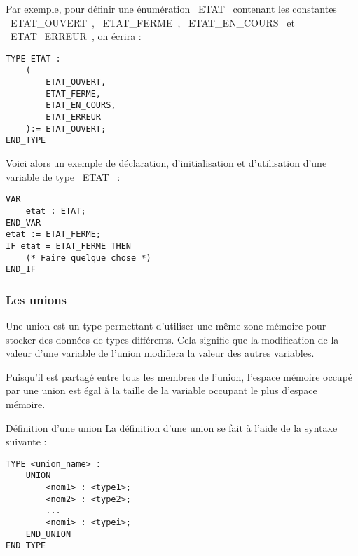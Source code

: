 Par exemple, pour définir une énumération ~ETAT~ contenant les constantes ~ETAT\_OUVERT~, ~ETAT\_FERME~, ~ETAT\_EN\_COURS~ et ~ETAT\_ERREUR~, on écrira :
\begin{lstlisting}[language=ST]
TYPE ETAT :
    (
        ETAT_OUVERT,
        ETAT_FERME,
        ETAT_EN_COURS,
        ETAT_ERREUR
    ):= ETAT_OUVERT;
END_TYPE\end{lstlisting}

Voici alors un exemple de déclaration, d'initialisation et d'utilisation d'une variable de type ~ETAT~ :
\begin{lstlisting}[language=ST]
VAR
    etat : ETAT;
END_VAR
etat := ETAT_FERME;
IF etat = ETAT_FERME THEN
    (* Faire quelque chose *)
END_IF\end{lstlisting}


\subsubsection{Les unions}
Une union est un type permettant d'utiliser une même zone mémoire pour stocker des données de types différents. Cela signifie que la modification de la valeur d'une variable de l'union modifiera la valeur des autres variables.

Puisqu'il est partagé entre tous les membres de l'union, l'espace mémoire occupé par une union est égal à la taille de la variable occupant le plus d'espace mémoire.

\begin{UPSTIinfor}{Définition d'une union}
    La définition d'une union se fait à l'aide de la syntaxe suivante : 
    \begin{lstlisting}[language=ST]
TYPE <union_name> :
    UNION
        <nom1> : <type1>;
        <nom2> : <type2>;
        ...
        <nomi> : <typei>;
    END_UNION  
END_TYPE\end{lstlisting}
\end{UPSTIinfor}


